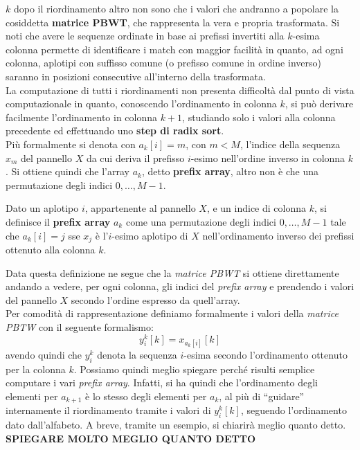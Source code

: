 $k$ dopo il riordinamento altro non sono che i valori che andranno a popolare la
cosiddetta \textbf{matrice PBWT}, che rappresenta la vera e propria
trasformata. Si noti che avere le sequenze 
ordinate in base ai prefissi invertiti alla $k$-esima colonna permette di
identificare i match con maggior facilità in quanto, ad ogni colonna, aplotipi
con suffisso comune (o prefisso comune in ordine inverso) saranno in posizioni
consecutive all'interno della trasformata.\\
La computazione di tutti i riordinamenti non presenta difficoltà dal punto di
vista computazionale in quanto, conoscendo l'ordinamento in colonna $k$, si può
derivare facilmente l'ordinamento in colonna $k+1$, studiando solo i valori alla
colonna precedente ed effettuando uno \textbf{step di radix sort}.\\
Più formalmente si denota con $a_k[i]=m$, con $m<M$, l'indice della sequenza
$x_m$ del pannello $X$ da cui deriva il prefisso $i$-esimo nell'ordine inverso
in colonna $k$. Si ottiene quindi che l'array $a_k$, detto \textbf{prefix
  array}, altro non è che una permutazione degli indici $0,\ldots,M-1$.
\begin{definizione}
  Dato un aplotipo $i$, appartenente al pannello $X$, e un indice di colonna
  $k$, si definisce il \textbf{prefix array} $a_k$ come una permutazione degli
  indici $0,\ldots, M-1$ tale che $a_k[i]=j$ sse $x_j$ è l'$i$-esimo aplotipo di
  $X$ nell'ordinamento inverso dei prefissi ottenuto alla colonna $k$.
\end{definizione}
Data questa definizione ne segue che la \textit{matrice PBWT} si ottiene
direttamente andando a vedere, per ogni colonna, gli indici del \textit{prefix
  array} e prendendo i valori del pannello $X$ secondo l'ordine espresso da
quell'array.\\ 
Per comodità di rappresentazione definiamo formalmente i valori della
\textit{matrice PBTW} con il seguente formalismo:
\[y_i^k[k]=x_{a_k[i]}[k]\]
avendo quindi che $y_i^k$ denota la sequenza $i$-esima secondo l'ordinamento
ottenuto per la colonna $k$. Possiamo quindi meglio spiegare perché risulti
semplice computare i vari \textit{prefix array}. Infatti, si ha
quindi che l'ordinamento degli elementi per $a_{k+1}$ è lo stesso degli elementi
per $a_k$, al più di ``guidare'' internamente il riordinamento tramite i valori
di $y_i^k[k]$, seguendo l'ordinamento dato dall'alfabeto. A breve, tramite un
esempio, si chiarirà meglio quanto detto.\\
\textbf{SPIEGARE MOLTO MEGLIO QUANTO DETTO}\\
